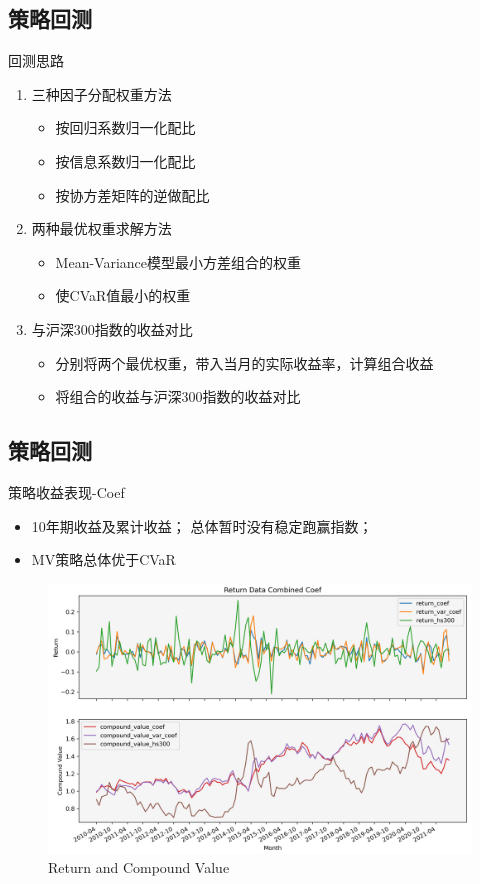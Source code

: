 \documentclass[CJK,aspectratio=43]{beamer}  %
\begin{document}
\subsection{策略回测}
\begin{frame}{回测思路}
	\begin{enumerate}
		\item 三种因子分配权重方法
		\begin{itemize}
			\item 按回归系数归一化配比
			\item 按信息系数归一化配比
			\item 按协方差矩阵的逆做配比
		\end{itemize}
		\item 两种最优权重求解方法
		\begin{itemize}
			\item Mean-Variance模型最小方差组合的权重
			\item 使CVaR值最小的权重
		\end{itemize}
		\item 与沪深300指数的收益对比
		\begin{itemize}
			\item 分别将两个最优权重，带入当月的实际收益率，计算组合收益
			\item 将组合的收益与沪深300指数的收益对比
		\end{itemize}
	\end{enumerate}
\end{frame}

\subsection{策略回测}
\begin{frame}{策略收益表现-Coef}
	\begin{itemize}
		\item 10年期收益及累计收益； 总体暂时没有稳定跑赢指数； 
		\item MV策略总体优于CVaR
	\end{itemize}
	\begin{figure}
		\centering
		\includegraphics[width=0.8\linewidth]{pic/Coef}
		\caption{Return and Compound Value}
		\label{fig:coef}
	\end{figure}
\end{frame}
\end{document}
